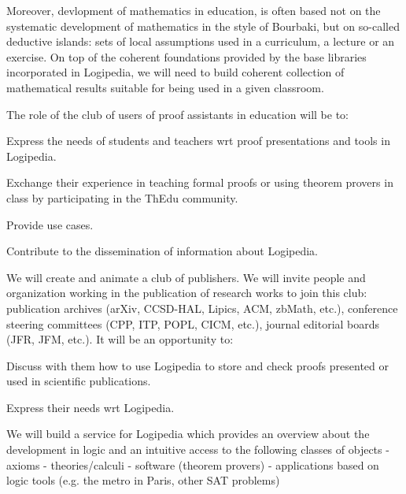 \begin{workpackage}[id=dissemination,wphases=0-48,type=MGT,
  short=Dissemination,%
  title={Dissemination, communication and exploitation},
  lead=Inr]
\begin{tasklist}
\begin{task}[id=teachers-club,
      title=Expanding the use of Logipedia in education,
      lead=Str,StrRM=2]
    Moreover, devlopment of mathematics in education, is often based
    not on the systematic development of mathematics in the style of
    Bourbaki, but on so-called deductive islands: sets of local
    assumptions used in a curriculum, a lecture or an exercise.  On
    top of the coherent foundations provided by the base libraries
    incorporated in Logipedia, we will need to build coherent
    collection of mathematical results suitable for being used in a
    given classroom.

    The role of the club of users of proof assistants in education will be to:
    \begin{compactitem}
    \item Express the needs of students and teachers wrt proof
      presentations and tools in Logipedia.
    \item Exchange their experience in teaching formal proofs or using
      theorem provers in class by participating in the ThEdu community.
    \item Provide use cases.
    \item Contribute to the dissemination of information about Logipedia.
    \end{compactitem}

  \end{task}

  \begin{task}[id=publishers-club,
      title=Expanding the use of Logipedia in publishing,
      lead=Zib,ZibRM=12]
    We will create and animate a club of publishers. We will invite
    people and organization working in the publication of research
    works to join this club: publication archives (arXiv, CCSD-HAL,
    Lipics, ACM, zbMath, etc.), conference steering committees (CPP,
    ITP, POPL, CICM, etc.), journal editorial boards (JFR, JFM,
    etc.). It will be an opportunity to:
    \begin{compactitem}
    \item Discuss with them how to use Logipedia to store and check
      proofs presented or used in scientific publications.
    \item Express their needs wrt Logipedia.
    \end{compactitem}
  \end{task}

  \begin{task}[id=zib,
      title=Expanding the use of Logipedia in publishing,
      lead=Zib,ZibRM=12]
    We will build a service for Logipedia which provides an overview
    about the development in logic and an intuitive access to the
    following classes of objects - axioms - theories/calculi -
    software (theorem provers) - applications based on logic tools
    (e.g. the metro in Paris, other SAT problems)


\end{task}
\end{tasklist}
\end{workpackage}
